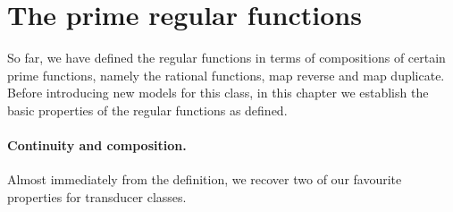 \section{The prime regular functions}
\label{sec:prime-regular-functions}

So far, we have defined the regular functions in terms of compositions of certain prime functions, namely the rational functions, map reverse and map duplicate. Before introducing new models for this class, in this chapter we establish the basic properties of the regular functions as defined. 

\paragraph*{Continuity and composition.} Almost immediately from the definition, we recover two of our favourite properties for transducer classes.

